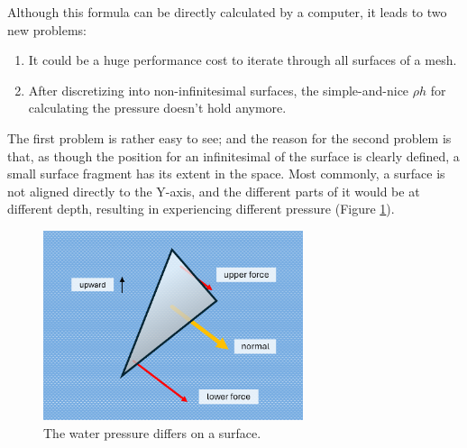 Although this formula can be directly calculated by a computer, it leads to two new problems:
\begin{enumerate}
	\item It could be a huge performance cost to iterate through all surfaces of a mesh.
	\item After discretizing into non-infinitesimal surfaces, the simple-and-nice $\rho h$ for calculating the pressure doesn't hold anymore.
\end{enumerate}

The first problem is rather easy to see;
and the reason for the second problem is that, as though the position for an infinitesimal of the surface is clearly defined, a small surface fragment has its extent in the space.
Most commonly, a surface is not aligned directly to the Y-axis, and the different parts of it would be at different depth, resulting in experiencing different pressure (Figure \ref{water-pressure-differs-on-surface}).

\begin{figure}[h]
	\begin{center}
		\includegraphics[width=3in]{figures/water-pressure-on-small-surface.png}
	\end{center}
	\caption{The water pressure differs on a surface.}
	\label{water-pressure-differs-on-surface}
\end{figure}
